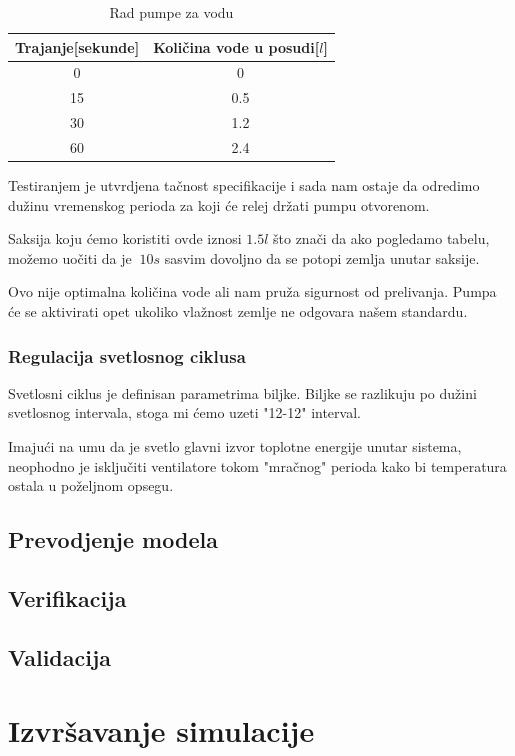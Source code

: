 \documentclass[a4paper,11pt]{book}
\begin{document}
\begin{table}[ht]
  \caption{Rad pumpe za vodu}
  \centering
  \begin{tabular}{|c|c|}
  \hline
    Trajanje[sekunde] & Količina vode u posudi[$l$]\\ \hline
  0 & 0 \\ \hline
  15 & 0.5 \\ \hline
  30 & 1.2 \\ \hline
  60 & 2.4 \\ \hline
  \end{tabular}
\end{table}

Testiranjem je utvrdjena tačnost specifikacije i sada nam ostaje da odredimo dužinu vremenskog perioda za koji će relej držati pumpu otvorenom.

Saksija koju ćemo koristiti ovde iznosi $1.5l$ što znači da ako pogledamo tabelu, možemo uočiti da je $~10s$ sasvim dovoljno da se potopi zemlja unutar saksije.

Ovo nije optimalna količina vode ali nam pruža sigurnost od prelivanja. Pumpa će se aktivirati opet ukoliko vlažnost zemlje ne odgovara našem standardu.

\subsection{Regulacija svetlosnog ciklusa}

Svetlosni ciklus je definisan parametrima biljke. Biljke se razlikuju po dužini svetlosnog intervala, stoga mi ćemo uzeti "12-12" interval. 

Imajući na umu da je svetlo glavni izvor toplotne energije unutar sistema, neophodno je isključiti ventilatore tokom "mračnog" perioda kako bi temperatura ostala u poželjnom opsegu.

\section{Prevodjenje modela}

\section{Verifikacija}
 
\section{Validacija}

\chapter{Izvršavanje simulacije}
\end{document}
